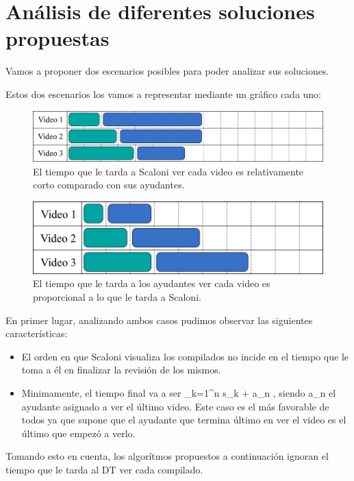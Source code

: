 \section{Análisis de diferentes soluciones propuestas}
Vamos a proponer dos escenarios posibles para poder analizar sus soluciones. 

Estos dos escenarios los vamos a representar mediante un gráfico cada uno:
\begin{figure}[H]
    \centering
    \includegraphics[width=1\textwidth]{img/caso-1-corto-largo.png}
    \caption{El tiempo que le tarda a Scaloni ver cada video es relativamente corto comparado con sus ayudantes.}
    \label{fig:Caso 1}
\end{figure}


\begin{figure}[H]
    \centering
    \includegraphics[width=1\textwidth]{img/caso-2-proporcionales.png}
    \caption{El tiempo que le tarda a los ayudantes ver cada video es proporcional a lo que le tarda a Scaloni.}
    \label{fig:Caso 2}
\end{figure}

En primer lugar, analizando ambos casos pudimos observar las siguientes características:
\begin{itemize}
    \item El orden en que Scaloni visualiza los compilados no incide 
    en el tiempo que le toma a él en finalizar la revisión de los mismos. 
    \item Minimamente, el tiempo final va a ser \sum_{k=1}^{n} s_k + a_n , siendo a_n el ayudante asignado a ver 
    el último video. Este caso es el más favorable de todos ya que supone que el ayudante que termina último en ver 
    el video es el último que empezó a verlo.
\end{itemize}

Tomando esto en cuenta, los algorítmos propuestos a continuación ignoran el tiempo que le tarda
al DT ver cada compilado. 

